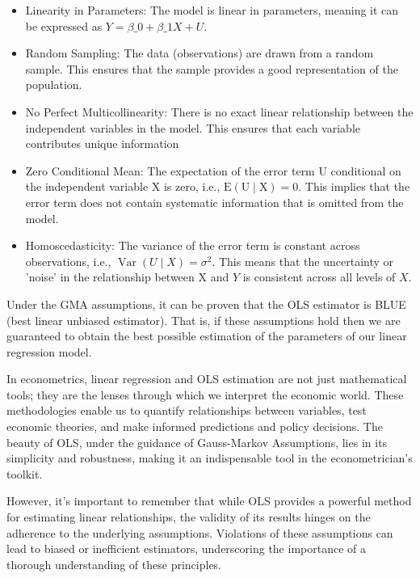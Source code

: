 \documentclass[10pt]{article}
\begin{document}
\begin{itemize}
  \item Linearity in Parameters: The model is linear in parameters, meaning it can be expressed as $Y=\beta \_0+\beta \_1 X+U$.
  \item Random Sampling: The data (observations) are drawn from a random sample. This ensures that the sample provides a good representation of the population.
  \item No Perfect Multicollinearity: There is no exact linear relationship between the independent variables in the model. This ensures that each variable contributes unique information
  \item Zero Conditional Mean: The expectation of the error term U conditional on the independent variable X is zero, i.e., $\mathrm{E}(\mathrm{U} \mid \mathrm{X})=0$. This implies that the error term does not contain systematic information that is omitted from the model.
  \item Homoscedasticity: The variance of the error term is constant across observations, i.e., $\operatorname{Var}(U \mid X)=\sigma^{2}$. This means that the uncertainty or 'noise' in the relationship between X and $Y$ is consistent across all levels of $X$.
\end{itemize}

Under the GMA assumptions, it can be proven that the OLS estimator is BLUE (best linear unbiased estimator). That is, if these assumptions hold then we are guaranteed to obtain the best possible estimation of the parameters of our linear regression model.

In econometrics, linear regression and OLS estimation are not just mathematical tools; they are the lenses through which we interpret the economic world. These methodologies enable us to quantify relationships between variables, test economic theories, and make informed predictions and policy decisions. The beauty of OLS, under the guidance of Gauss-Markov Assumptions, lies in its simplicity and robustness, making it an indispensable tool in the econometrician's toolkit.

However, it's important to remember that while OLS provides a powerful method for estimating linear relationships, the validity of its results hinges on the adherence to the underlying assumptions. Violations of these assumptions can lead to biased or inefficient estimators, underscoring the importance of a thorough understanding of these principles.
\end{document}
